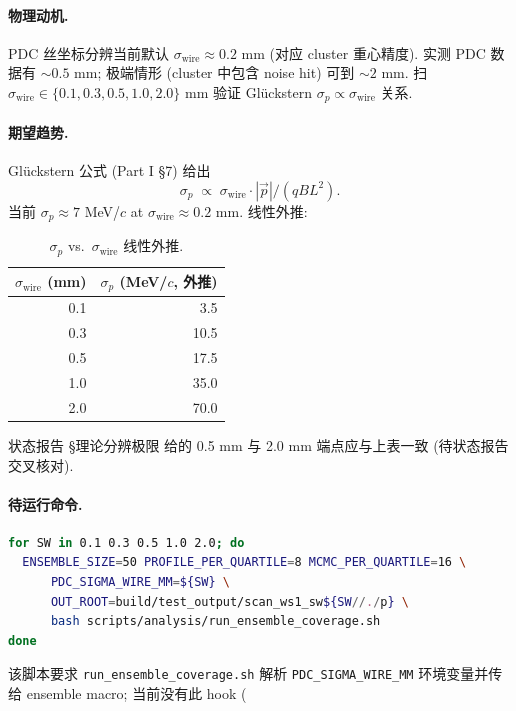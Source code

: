 \paragraph{物理动机.}
PDC 丝坐标分辨当前默认 $\sigma_{\mathrm{wire}} \approx 0.2$ mm (对应 cluster 重心精度). 实测 PDC 数据有 $\sim 0.5$ mm; 极端情形 (cluster 中包含 noise hit) 可到 $\sim 2$ mm. 扫 $\sigma_{\mathrm{wire}} \in \{0.1, 0.3, 0.5, 1.0, 2.0\}$ mm 验证 Glückstern $\sigma_p \propto \sigma_{\mathrm{wire}}$ 关系.

\paragraph{期望趋势.}
Glückstern 公式 (Part I §7) 给出
\[
  \sigma_p \;\propto\; \sigma_{\mathrm{wire}} \cdot |\vec p| / (qBL^2).
\]
当前 $\sigma_p \approx 7$ MeV/$c$ at $\sigma_{\mathrm{wire}} \approx 0.2$ mm. 线性外推:

\begin{table}[H]
\centering\small
\caption{$\sigma_p$ vs.\ $\sigma_{\mathrm{wire}}$ 线性外推.}
\label{tab:partIII:ws1_extrapolate}
\begin{tabular}{rr}
\toprule
$\sigma_{\mathrm{wire}}$ (mm) & $\sigma_p$ (MeV/$c$, 外推) \\
\midrule
0.1 & 3.5 \\
0.3 & 10.5 \\
0.5 & 17.5 \\
1.0 & 35.0 \\
2.0 & 70.0 \\
\bottomrule
\end{tabular}
\end{table}

状态报告 §理论分辨极限 给的 0.5 mm 与 2.0 mm 端点应与上表一致 (待状态报告交叉核对).

\paragraph{待运行命令.}
\begin{lstlisting}[language=bash,caption={sigma\_wire scan WS-1},label=lst:partIII:ws1_cmd]
for SW in 0.1 0.3 0.5 1.0 2.0; do
  ENSEMBLE_SIZE=50 PROFILE_PER_QUARTILE=8 MCMC_PER_QUARTILE=16 \
      PDC_SIGMA_WIRE_MM=${SW} \
      OUT_ROOT=build/test_output/scan_ws1_sw${SW//./p} \
      bash scripts/analysis/run_ensemble_coverage.sh
done
\end{lstlisting}
该脚本要求 \texttt{run\_ensemble\_coverage.sh} 解析 \texttt{PDC\_SIGMA\_WIRE\_MM} 环境变量并传给 ensemble macro; 当前没有此 hook (%

